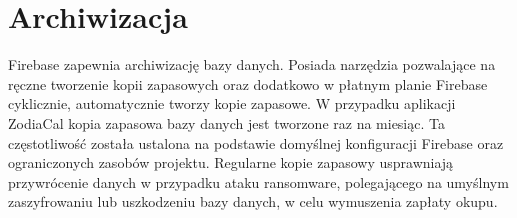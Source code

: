 \section*{Archiwizacja}
Firebase zapewnia archiwizację bazy danych. Posiada narzędzia pozwalające na ręczne tworzenie kopii zapasowych oraz dodatkowo w płatnym planie Firebase cyklicznie, automatycznie tworzy kopie zapasowe. W przypadku aplikacji ZodiaCal kopia zapasowa bazy danych jest tworzone raz na miesiąc. Ta częstotliwość została ustalona na podstawie domyślnej konfiguracji Firebase oraz ograniczonych zasobów projektu.
Regularne kopie zapasowy usprawniają przywrócenie danych w przypadku ataku ransomware, polegającego na umyślnym zaszyfrowaniu lub uszkodzeniu bazy danych, w celu wymuszenia zapłaty okupu.

